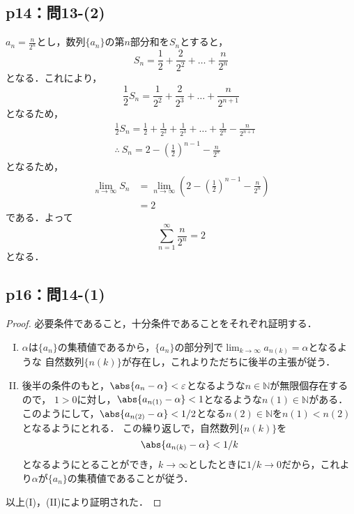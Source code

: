 \documentclass[uplatex,dvipdfmx,a4paper,10pt,fleqn]{jsarticle}
\begin{document}
\subsection*{p14：問13-(2)}

\begin{tleftbar}
    $a_n = \frac{n}{2^n}$とし，数列$\{ a_n \}$の第$n$部分和を$S_n$とすると，
    \[
        S_n = \frac{1}{2}+ \frac{2}{2^2}+\dots + \frac{n}{2^n}
    \]
    となる．これにより，
    \[
        \frac{1}{2} S_n = \frac{1}{2^2}+\frac{2}{2^3}+\dots + \frac{n}{2^{n+1}}
    \]
    となるため，
    \begin{align*} 
        & \frac{1}{2} S_n = \frac{1}{2}+ \frac{1}{2^2}  +\frac{1}{2^3}+\dots +\frac{1}{2^n}-\frac{n}{2^{n+1}} \\
       & \therefore ~ S_n = 2- \left (\frac{1}{2} \right)^{n-1} -\frac{n}{2^n}
    \end{align*} 
    となるため，
    \begin{align*}
        \lim_{n \to \infty} S_n &= \lim_{n \to \infty}\left ( 2- \left (\frac{1}{2} \right)^{n-1} -\frac{n}{2^n} \right ) \\
        & = 2
    \end{align*}
    である．よって
    \[
        \sum_{n=1}^{\infty} \frac{n}{2^n}=2
    \]
    となる．
\end{tleftbar}


\subsection*{p16：問14-(1)}

\begin{tleftbar}
    \begin{proof}
    必要条件であること，十分条件であることをそれぞれ証明する．
    \begin{enumerate}[(I)]
        \item $\alpha$は$\{ a_n \}$の集積値であるから，$\{ a_n \}$の部分列で$\lim_{k\to \infty} a_{n(k)} = \alpha$となるような
        自然数列$\{ n (k) \}$が存在し，これよりただちに後半の主張が従う．
        \item 後半の条件のもと，$\abs{a_n - \alpha}< \varepsilon$となるような$n \in \mathbb{N}$が無限個存在するので，
        $1>0$に対し，$\abs{a_{n(1)}-\alpha}<1$となるような$n(1) \in \mathbb{N}$がある．
        このようにして，$\abs{a_{n(2)}-\alpha}< 1/2$となる$n(2) \in \mathbb{N}$を$n (1)<n(2)$となるようにとれる．
        この繰り返しで，自然数列$\{ n(k) \}$を
        \[
            \abs{a_{n(k)}-\alpha}< 1/k
        \]
        となるようにとることができ，$k \to \infty$としたときに$1/k \to 0$だから，これより$\alpha$が$\{ a_n \}$の集積値であることが従う．
    \end{enumerate}
    以上(I)，(II)により証明された．
    \end{proof}
\end{tleftbar}
\end{document}
